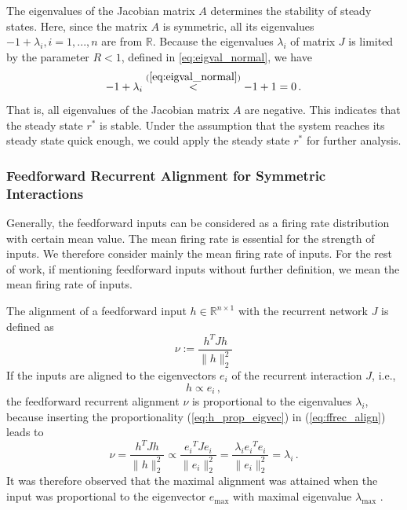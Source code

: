 \documentclass[11pt]{article}
\begin{document}
	The eigenvalues of the Jacobian matrix $A$ determines the stability of steady states. Here, since the matrix $A$ is symmetric, all its eigenvalues $-1 + \lambda_i, i = 1, ..., n$ are from $\mathbb{R}$. Because the eigenvalues $\lambda_i$ of matrix $J$ is limited by the parameter $R<1$, defined in \ref{eq:eigval_normal}, we have 
		\begin{equation} \label{eq:sym_stable_fix_point}
			-1 + \lambda_i \overset{(\ref{eq:eigval_normal})}{<} -1 + 1 = 0 \, .
		\end{equation}
	That is, all eigenvalues of the Jacobian matrix $A$ are negative. This indicates that the steady state $r^*$ is stable. Under the assumption that the system reaches its steady state quick enough, we could apply the steady state $r^*$ for further analysis. 
	
	\subsubsection{Feedforward Recurrent Alignment for Symmetric Interactions} \label{sec:ffrec_definition}
	Generally, the feedforward inputs can be considered as a firing rate distribution with certain mean value. The mean firing rate is essential for the strength of inputs. We therefore consider mainly the mean firing rate of inputs. For the rest of work, if mentioning feedforward inputs without further definition, we mean the mean firing rate of inputs. 
	
	The alignment of a feedforward input $h \in \mathbb{R}^{n \times 1}$ with the recurrent network $J$ is defined as \cite{tragenap2023nature}
		\begin{equation} \label{eq:ffrec_align}
			\nu := \frac{h^T J h}{\parallel h \parallel_2 ^2}
		\end{equation}	
	If the inputs are aligned to the eigenvectors $e_i$ of the recurrent interaction $J$, i.e., 
		\begin{equation} \label{eq:h_prop_eigvec}
			h \propto e_i  \, ,
		\end{equation}
	the feedforward recurrent alignment $\nu$ is proportional to the eigenvalues $\lambda_i$, because inserting the proportionality (\ref{eq:h_prop_eigvec}) in (\ref{eq:ffrec_align}) leads to
		\begin{equation} \label{eq:ffrec_equals_eigval}
			\nu = \frac{h^T J h}{\parallel h \parallel_2 ^2} \propto \frac{{e_i}^T J e_i}{\parallel e_i \parallel_2 ^2} = \frac{\lambda_i {e_i}^T e_i}{\parallel e_i \parallel_2 ^2} = \lambda_i \, .
		\end{equation}
	It was therefore observed that the maximal alignment was attained when the input was proportional to the eigenvector $e_{\text{max}}$ with maximal eigenvalue $\lambda_{\text{max}}$ \cite{tragenap2023nature}. 
	
\end{document}

